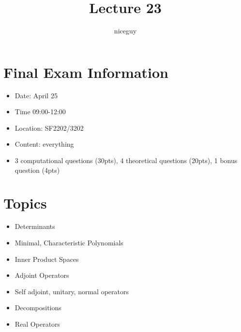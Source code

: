 \documentclass[12pt]{article}
\author{niceguy}
\title{Lecture 23}
\begin{document}
\maketitle

\section{Final Exam Information}

\begin{itemize}
    \item Date: April 25
    \item Time 09:00-12:00
    \item Location: SF2202/3202
    \item Content: everything
    \item 3 computational questions (30pts), 4 theoretical questions (20pts), 1 bonus question (4pts)
\end{itemize}

\section{Topics}

\begin{itemize}
    \item Determinants
    \item Minimal, Characteristic Polynomials
    \item Inner Product Spaces
    \item Adjoint Operators
    \item Self adjoint, unitary, normal operators
    \item Decompositions
    \item Real Operators
\end{itemize}
\end{document}
